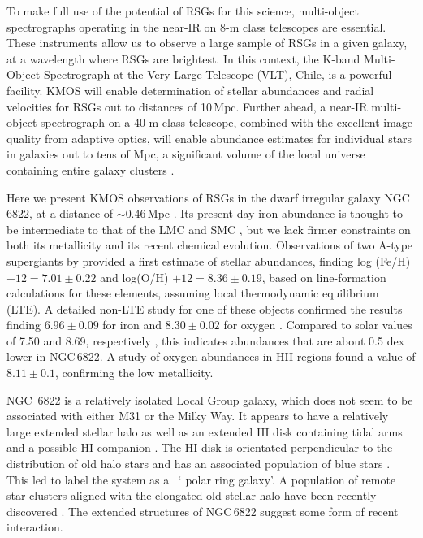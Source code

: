 \documentclass[iop]{emulateapj}
\begin{document}
To make full use of the potential of RSGs for this science, multi-object spectrographs operating in the near-IR on 8-m class telescopes are essential.
These instruments allow us to observe a large sample of RSGs in a given galaxy, at a wavelength where RSGs are brightest.
In this context, the K-band Multi-Object Spectrograph
\citep[KMOS;][]{2013Msngr.151...21S} at the Very Large Telescope (VLT), Chile, is a powerful facility.
KMOS will enable determination of stellar abundances and radial velocities for RSGs out to distances of 10\,Mpc.
Further ahead, a near-IR multi-object spectrograph on a 40-m class telescope, combined with the excellent image quality from adaptive optics,
will enable abundance estimates for individual stars in galaxies out to tens of Mpc,
a significant volume of the local universe containing entire galaxy clusters
\citep{2011A&A...527A..50E}.

Here we present KMOS observations of RSGs in the dwarf irregular galaxy NGC\,6822,
at a distance of $\sim$0.46\,Mpc
\citep[][and references therein]{2012AJ....144....4M}.
Its present-day iron abundance is thought to be intermediate to that of the LMC and SMC
\citep{2013ApJ...779..102K},
but we lack firmer constraints on both its metallicity and its recent chemical evolution.
Observations of two A-type supergiants by
\cite{2001ApJ...547..765V} provided a first estimate of stellar abundances, finding
log (Fe/H) $+12=7.01\pm0.22$ and
log(O/H)   $+12=8.36\pm0.19$, based on line-formation calculations for these elements,
assuming local thermodynamic equilibrium (LTE).
A detailed non-LTE study for one of these objects confirmed the results finding
$6.96\pm 0.09$ for iron and $8.30\pm0.02$ for oxygen
\citep{Przybilla02}.
Compared to solar values of 7.50 and 8.69, respectively
\citep{2009ARA&A..47..481A}, 
this indicates abundances that are about 0.5 dex lower in NGC\,6822.
A study of oxygen abundances in HII regions
\citep{2006ApJ...642..813L} found a value of $8.11\pm0.1$, confirming the low metallicity.


NGC\, 6822 is a relatively isolated Local Group galaxy, which does not seem to be associated with either M31 or the Milky Way.
It appears to have a relatively large extended stellar halo
\citep{2002AJ....123..832L,2014ApJ...783...49H} 
as well as an extended HI disk containing tidal arms and a possible HI companion
\citep{2000ApJ...537L..95D}.
The HI disk is orientated perpendicular to the distribution of old halo stars and has an associated population of blue stars 
\citep{2003MNRAS.341L..39D,2003ApJ...590L..17K}.
This led \cite{2006ApJ...636L..85D} to label the system as a
~\textquoteleft
polar ring galaxy\textquoteright.
A population of remote star clusters aligned with the elongated old stellar halo have been recently discovered
\citep{2011ApJ...738...58H,2013MNRAS.429.1039H}.
The extended structures of NGC\,6822 suggest some form of recent interaction.
\end{document}
